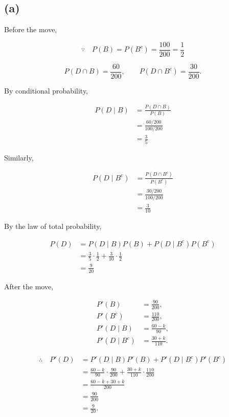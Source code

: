 \documentclass[11pt,a4paper]{article}
\begin{document}
\subsection*{(a)}

Before the move,

\[
\because\quad
P(B)=P(B^c)=\frac{100}{200}=\frac12
\]

\[
P(D\cap B)=\frac{60}{200},
\qquad
P(D\cap B^c)=\frac{30}{200}.
\]

By conditional probability,

\[
\begin{aligned}
P(D\mid B)
&=\frac{P(D\cap B)}{P(B)}\\
&=\frac{60/200}{100/200}\\
&=\frac35
\end{aligned}
\]

Similarly,

\[
\begin{aligned}
P(D\mid B^c)
&=\frac{P(D\cap B^c)}{P(B^c)}\\
&=\frac{30/200}{100/200}\\
&=\frac3{10}
\end{aligned}
\]

By the law of total probability,

\[
\begin{aligned}
P(D)
&=P(D\mid B)P(B)
 +P(D\mid B^c)P(B^c)\\
&=\frac35\cdot\frac12
 +\frac3{10}\cdot\frac12\\
&=\frac9{20}
\end{aligned}
\]

After the move,

\[
\begin{aligned}
P'(B)&=\frac{90}{200},\\
P'(B^c)&=\frac{110}{200},\\
P'(D\mid B)&=\frac{60-k}{90},\\
P'(D\mid B^c)&=\frac{30+k}{110}.
\end{aligned}
\]

\[
\begin{aligned}
\therefore\quad P'(D)
&=P'(D\mid B)P'(B)
 +P'(D\mid B^c)P'(B^c)\\
&=\frac{60-k}{90}\cdot\frac{90}{200}
 +\frac{30+k}{110}\cdot\frac{110}{200}\\
&=\frac{60-k+30+k}{200}\\
&=\frac{90}{200}\\
&=\frac9{20}.
\end{aligned}
\]
\end{document}
